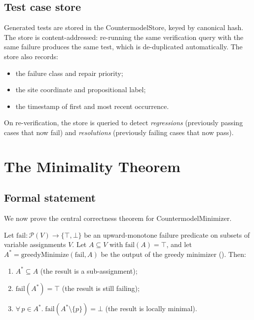 \documentclass[11pt]{article}
\newcommand{\Fail}{\mathrm{fail}}          %
\begin{document}
\subsection{Test case store}

Generated tests are stored in the \textsf{CountermodelStore}, keyed by
canonical hash.  The store is content-addressed: re-running the same
verification query with the same failure produces the same test, which
is de-duplicated automatically.  The store also records:
\begin{itemize}[leftmargin=1.5em]
  \item the failure class and repair priority;
  \item the site coordinate and propositional label;
  \item the timestamp of first and most recent occurrence.
\end{itemize}
On re-verification, the store is queried to detect \emph{regressions}
(previously passing cases that now fail) and \emph{resolutions}
(previously failing cases that now pass).


\section{The Minimality Theorem}
\label{sec:minimality}

\subsection{Formal statement}

We now prove the central correctness theorem for
\textsf{CountermodelMinimizer}.

\begin{theorem}[Minimality]\label{thm:minimality}
Let $\Fail : \mathcal{P}(V) \to \{\top,\bot\}$ be an upward-monotone
failure predicate on subsets of variable assignments $V$.  Let
$A \subseteq V$ with $\Fail(A) = \top$, and let
$A^* = \mathrm{greedyMinimize}(\Fail, A)$ be the output of the
greedy minimizer ().  Then:
\begin{enumerate}
  \item[(i)] $A^* \subseteq A$ \quad (the result is a sub-assignment);
  \item[(ii)] $\Fail(A^*) = \top$ \quad (the result is still failing);
  \item[(iii)] $\forall\, p \in A^*.\; \Fail(A^* \setminus \{p\}) = \bot$
               \quad (the result is locally minimal).
\end{enumerate}
\end{theorem}
\end{document}
